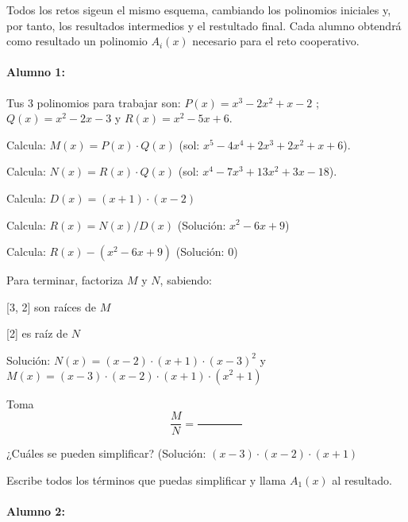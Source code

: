 

Todos los retos sigeun el mismo esquema, cambiando los polinomios iniciales y, por tanto, los resultados intermedios y el restultado final.
%
Cada alumno obtendrá como resultado un polinomio $A_i(x)$ necesario para el reto cooperativo.

\paragraph{Alumno 1:\\}



Tus 3 polinomios para trabajar son: $P(x) =  x^3 - 2x^2 + x - 2 $ ; $Q(x) =  x^2 - 2x - 3 $ y $R(x) =  x^2 - 5x + 6 $.



Calcula: $M(x) = P(x)\cdot  Q(x)$ (sol: $ x^5 - 4x^4 + 2x^3 + 2x^2 + x + 6 $).

Calcula: $N(x) = R(x)\cdot  Q(x)$ (sol: $ x^4 - 7x^3 + 13x^2 + 3x - 18 $).

Calcula: $D(x) = ( x + 1 )\cdot  ( x - 2 )$

Calcula: $R(x) = N(x) / D(x)$ (Solución: $ x^2 - 6x + 9 $)

Calcula: $R(x) - ( x^2 - 6x + 9 )$ (Solución: $ 0 $)

Para terminar, factoriza $M$ y $N$, sabiendo:

     [3, 2]  son raíces de $M$

     [2]  es raíz de $N$

Solución: $N(x) =  (x - 2) \cdot  (x + 1) \cdot  (x - 3)^2 $ y $M(x) =  (x - 3) \cdot  (x - 2) \cdot  (x + 1) \cdot  (x^2 + 1) $

Toma \[\frac{M}{N} = \frac{\quad\quad\quad\quad}{\quad\quad\quad\quad}\]

¿Cuáles se pueden simplificar? (Solución: $ (x - 3) \cdot  (x - 2) \cdot  (x + 1) $

Escribe todos los términos que puedas simplificar y llama $A_1(x)$ al resultado.













\paragraph{Alumno 2:\\}



